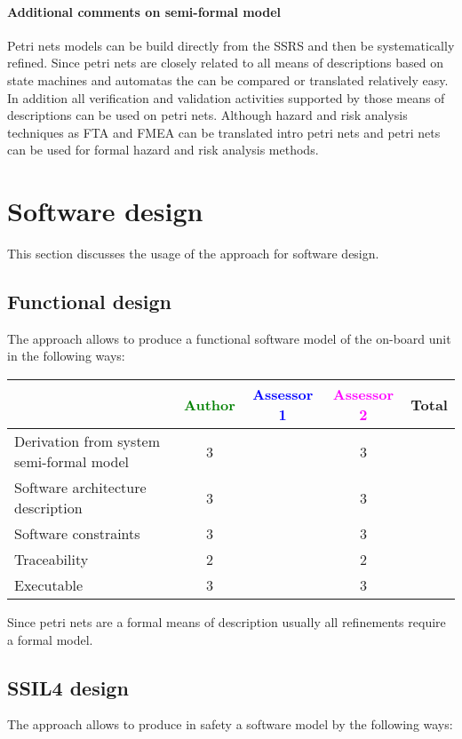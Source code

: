 \paragraph{Additional comments on semi-formal  model} 
Petri nets models can be build directly from the SSRS and then be systematically refined. 
Since petri nets are closely related to all means of descriptions based on state machines and automatas the can be compared or translated relatively easy. In addition all verification and validation activities supported by those means of descriptions can be used on petri nets. Although hazard and risk analysis techniques as FTA and FMEA can be translated intro petri nets and petri nets can be used for formal hazard and risk analysis methods.


\section{Software design}
This section discusses the usage of the approach for software design.

\subsection{Functional design}

The approach allows to  produce a functional software model of the on-board unit in the following ways:

\begin{tabular}{|l | c | c | c | c|}
\hline
& \textcolor{green}{Author} & \textcolor{blue}{Assessor 1} & \textcolor{magenta}{Assessor 2} & Total \\
\hline
Derivation from system semi-formal model  & 3    & & 3    &  \\
\hline 
Software architecture description  & 3    & & 3    &  \\
\hline
Software constraints  & 3    & & 3    &  \\
\hline
Traceability  & 2    & & 2    &  \\
\hline
Executable  & 3    & & 3    &  \\
\hline
\end{tabular}
Since petri nets are a formal means of description usually all refinements require a formal model.

\subsection{SSIL4 design}

The approach allows to  produce in safety a software model by the following ways:

